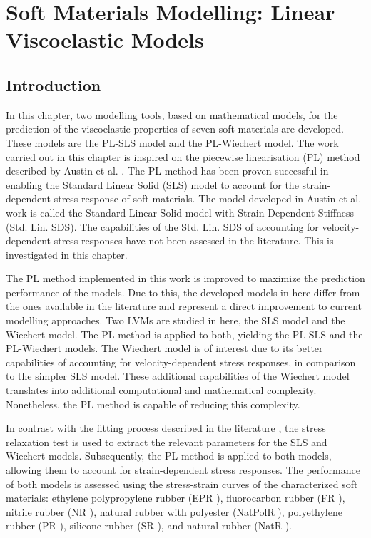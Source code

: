 \chapter{Soft Materials Modelling: Linear Viscoelastic Models} \label{sec:ChapterModellingLVM}


\section{Introduction}

In this chapter, two modelling tools, based on mathematical models, for the prediction of the viscoelastic properties of seven soft materials are developed. These models are the PL-SLS model and the PL-Wiechert model. The work carried out in this chapter is inspired on the piecewise linearisation (PL) method described by Austin et al. \cite{austin2015control}. The PL method has been proven successful in enabling the Standard Linear Solid (SLS) model to account for the strain-dependent stress response of soft materials. The model developed in Austin et al. work is called the Standard Linear Solid model with Strain-Dependent Stiffness (Std. Lin. SDS). The capabilities of the Std. Lin. SDS of accounting for velocity-dependent stress responses have not been assessed in the literature. This is investigated in this chapter. 

The PL method implemented in this work is improved to maximize the prediction performance of the models. Due to this, the developed models in here differ from the ones available in the literature and represent a direct improvement to current modelling approaches. Two LVMs are studied in here, the SLS model and the Wiechert model. The PL method is applied to both, yielding the PL-SLS and the PL-Wiechert models. The Wiechert model is of interest due to its better capabilities of accounting for velocity-dependent stress responses, in comparison to the simpler SLS model. These additional capabilities of the Wiechert model translates into additional computational and mathematical complexity. Nonetheless, the PL method is capable of reducing this complexity.

In contrast with the fitting process described in the literature \cite{austin2015control}, the stress relaxation test is used to extract the relevant parameters for the SLS and Wiechert models. Subsequently, the PL method is applied to both models, allowing them to account for strain-dependent stress responses. The performance of both models is assessed using the stress-strain curves of the characterized soft materials: ethylene polypropylene rubber (EPR \cite{EPRubber2019}), fluorocarbon rubber (FR \cite{FRubber2019}), nitrile rubber (NR \cite{NRubber2019}), natural rubber with polyester (NatPolR \cite{NatPolRubber2019}), polyethylene  rubber  (PR \cite{PRubber2019}), silicone  rubber  (SR \cite{SRubber2019}), and natural rubber (NatR \cite{NatRubber2019}).

